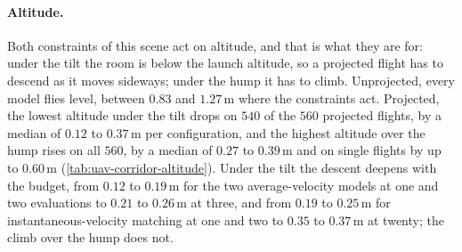 
\paragraph{Altitude.} Both constraints of this scene act on altitude, and that is what they are for: under
the tilt the room is below the launch altitude, so a projected flight has to descend as it moves sideways;
under the hump it has to climb. Unprojected, every model flies level, between $0.83$ and $1.27$\,m where
the constraints act. Projected, the lowest altitude under the tilt drops on $540$ of the $560$ projected
flights, by a median of $0.12$ to $0.37$\,m per configuration, and the highest altitude over the hump
rises on all $560$, by a median of $0.27$ to $0.39$\,m and on single flights by up to $0.60$\,m
(\autoref{tab:uav-corridor-altitude}). Under the tilt the descent deepens with the budget, from $0.12$ to
$0.19$\,m for the two average-velocity models at one and two evaluations to $0.21$ to $0.26$\,m at three,
and from $0.19$ to $0.25$\,m for instantaneous-velocity matching at one and two to $0.35$ to $0.37$\,m at
twenty; the climb over the hump does not.

